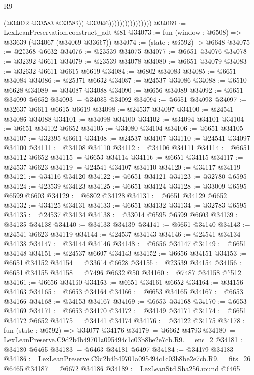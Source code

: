 \begin{lexlean}{R9}
\begin{coremodule}
                                      (@34032 @33583 @33586))
                                    @33946))))))))))))))))
@34069 := LexLeanPreservation.construct_adt @81
@34073 := fun (window : @6508) => @33639 (@34067 (@34069 @33667))
@34074 := (state : @6592) -> @6648
@34075 := @25368 @6632
@34076 := @23539 @34075
@34077 := @6651 @34076
@34078 := @32392 @6611
@34079 := @23539 @34078
@34080 := @6651 @34079
@34083 := @32632 @6611 @6615 @6619
@34084 := @6802 @34083
@34085 := @6651 @34084
@34086 := @25371 @6632
@34087 := @24537 @34086
@34088 := @6510 @6628
@34089 := @34087 @34088
@34090 := @6656 @34089
@34092 := @6651 @34090 @6652
@34093 := @34085 @34092
@34094 := @6651 @34093
@34097 := @32637 @6611 @6615 @6619
@34098 := @24537 @34097
@34100 := @24541 @34086 @34088
@34101 := @34098 @34100
@34102 := @34094 @34101
@34104 := @6651 @34102 @6652
@34105 := @34080 @34104
@34106 := @6651 @34105
@34107 := @32395 @6611
@34108 := @24537 @34107
@34110 := @24541 @34097 @34100
@34111 := @34108 @34110
@34112 := @34106 @34111
@34114 := @6651 @34112 @6652
@34115 := @6653 @34114
@34116 := @6651 @34115
@34117 := @24537 @6623
@34119 := @24541 @34107 @34110
@34120 := @34117 @34119
@34121 := @34116 @34120
@34122 := @6651 @34121
@34123 := @32780 @6595
@34124 := @23539 @34123
@34125 := @6651 @34124
@34128 := @33009 @6595 @6599 @6603
@34129 := @6802 @34128
@34131 := @6651 @34129 @6652
@34132 := @34125 @34131
@34133 := @6651 @34132
@34134 := @32783 @6595
@34135 := @24537 @34134
@34138 := @33014 @6595 @6599 @6603
@34139 := @34135 @34138
@34140 := @34133 @34139
@34141 := @6651 @34140
@34143 := @24541 @6623 @34119
@34144 := @24537 @34143
@34146 := @24541 @34134 @34138
@34147 := @34144 @34146
@34148 := @6656 @34147
@34149 := @6651 @34148
@34151 := @24537 @6607 @34143
@34152 := @6656 @34151
@34153 := @6651 @34152
@34154 := @33614 @6628
@34155 := @23539 @34154
@34156 := @6651 @34155
@34158 := @7496 @6632 @50
@34160 := @7487 @34158 @7512
@34161 := @6656 @34160
@34163 := @6651 @34161 @6652
@34164 := @34156 @34163
@34165 := @6653 @34164
@34166 := @6653 @34165
@34167 := @6653 @34166
@34168 := @34153 @34167
@34169 := @6653 @34168
@34170 := @6653 @34169
@34171 := @6653 @34170
@34172 := @34149 @34171
@34174 := @6651 @34172 @6652
@34175 := @34141 @34174
@34176 := @34122 @34175
@34178 := fun (state : @6592) => @34077 @34176
@34179 := @6662 @4793
@34180 := LexLeanPreserve.C9d2b4b49701a095494c1c03b8be2e7cb.R9.__enc_2
@34181 := @34180 @6465
@34183 := @6463 @34181 @6497
@34184 := @34179 @34183
@34186 := LexLeanPreserve.C9d2b4b49701a095494c1c03b8be2e7cb.R9.__fits_26 @6465
@34187 := @6672 @34186
@34189 := LexLeanStd.Sha256.round @6465

\end{coremodule}
\end{lexlean}
